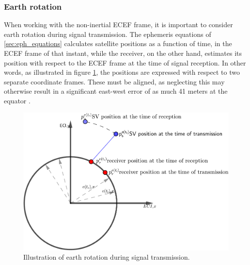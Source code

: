 \subsubsection{Earth rotation}
When working with the non-inertial ECEF frame, it is important to consider earth rotation during signal transmission. The ephemeris equations of \ref{sec:eph_equations} calculates satellite positions as a function of time, in the ECEF frame of that instant, while the receiver, on the other hand, estimates its position with respect to the ECEF frame at the time of signal reception. In other words, as illustrated in figure \ref{fig:sagnac}, the positions are expressed with respect to two separate coordinate frames. These must be aligned, as neglecting this may otherwise result in a significant east-west error of as much 41 meters at the equator \cite{groves2013principles}.\\

\begin{figure}[!htbp]
    \centering
    \includegraphics[scale=0.75]{bilder/sagnac.pdf}%
    \caption{Illustration of earth rotation during signal transmission. }
    \label{fig:sagnac}
\end{figure}

